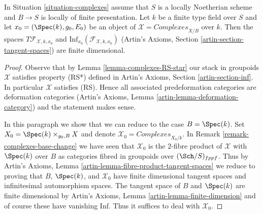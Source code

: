 \begin{lemma}
\label{lemma-complexes-tangent-space}
In Situation \ref{situation-complexes} assume that $S$ is a locally Noetherian
scheme and $B \to S$ is locally of finite presentation.
Let $k$ be a finite type field over $S$ and let
$x_0 = (\Spec(k), g_0, E_0)$
be an object of $\mathcal{X} = \textit{Complexes}_{X/B}$ over $k$.
Then the spaces $T\mathcal{F}_{\mathcal{X}, k, x_0}$ and
$\text{Inf}_{x_0}(\mathcal{F}_{\mathcal{X}, k, x_0})$
(Artin's Axioms, Section \ref{artin-section-tangent-spaces})
are finite dimensional.
\end{lemma}

\begin{proof}
Observe that by Lemma \ref{lemma-complexes-RS-star}
our stack in groupoids $\mathcal{X}$ satisfies property (RS*)
defined in Artin's Axioms, Section \ref{artin-section-inf}.
In particular $\mathcal{X}$ satisfies (RS).
Hence all associated predeformation
categories are deformation categories
(Artin's Axioms, Lemma \ref{artin-lemma-deformation-category})
and the statement makes sense.

\medskip\noindent
In this paragraph we show that we can reduce to the case $B = \Spec(k)$.
Set $X_0 = \Spec(k) \times_{g_0, B} X$
and denote $\mathcal{X}_0 = \textit{Complexes}_{X_0/k}$. In
Remark \ref{remark-complexes-base-change} we have seen that
$\mathcal{X}_0$ is the $2$-fibre product of $\mathcal{X}$ with
$\Spec(k)$ over $B$ as categories fibred in groupoids over
$(\Sch/S)_{fppf}$. Thus by
Artin's Axioms, Lemma \ref{artin-lemma-fibre-product-tangent-spaces}
we reduce to proving that $B$, $\Spec(k)$, and $\mathcal{X}_0$
have finite dimensional tangent spaces and infinitesimal automorphism
spaces. The tangent space of $B$ and $\Spec(k)$ are finite dimensional by
Artin's Axioms, Lemma \ref{artin-lemma-finite-dimension}
and of course these have vanishing $\text{Inf}$.
Thus it suffices to deal with $\mathcal{X}_0$.


\end{proof}
